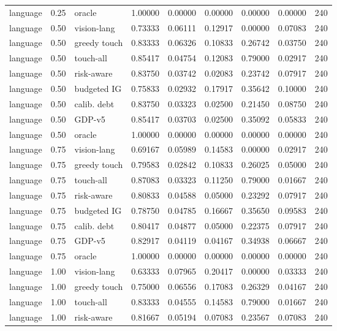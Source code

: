 \documentclass{article}
\begin{document}
\begin{center}
\begin{longtable}{lllllllll}
language & 0.25 & oracle & 1.00000 & 0.00000 & 0.00000 & 0.00000 & 0.00000 & 240 \\
language & 0.50 & vision-lang & 0.73333 & 0.06111 & 0.12917 & 0.00000 & 0.07083 & 240 \\
language & 0.50 & greedy touch & 0.83333 & 0.06326 & 0.10833 & 0.26742 & 0.03750 & 240 \\
language & 0.50 & touch-all & 0.85417 & 0.04754 & 0.12083 & 0.79000 & 0.02917 & 240 \\
language & 0.50 & risk-aware & 0.83750 & 0.03742 & 0.02083 & 0.23742 & 0.07917 & 240 \\
language & 0.50 & budgeted IG & 0.75833 & 0.02932 & 0.17917 & 0.35642 & 0.10000 & 240 \\
language & 0.50 & calib. debt & 0.83750 & 0.03323 & 0.02500 & 0.21450 & 0.08750 & 240 \\
language & 0.50 & GDP-v5 & 0.85417 & 0.03703 & 0.02500 & 0.35092 & 0.05833 & 240 \\
language & 0.50 & oracle & 1.00000 & 0.00000 & 0.00000 & 0.00000 & 0.00000 & 240 \\
language & 0.75 & vision-lang & 0.69167 & 0.05989 & 0.14583 & 0.00000 & 0.02917 & 240 \\
language & 0.75 & greedy touch & 0.79583 & 0.02842 & 0.10833 & 0.26025 & 0.05000 & 240 \\
language & 0.75 & touch-all & 0.87083 & 0.03323 & 0.11250 & 0.79000 & 0.01667 & 240 \\
language & 0.75 & risk-aware & 0.80833 & 0.04588 & 0.05000 & 0.23292 & 0.07917 & 240 \\
language & 0.75 & budgeted IG & 0.78750 & 0.04785 & 0.16667 & 0.35650 & 0.09583 & 240 \\
language & 0.75 & calib. debt & 0.80417 & 0.04877 & 0.05000 & 0.22375 & 0.07917 & 240 \\
language & 0.75 & GDP-v5 & 0.82917 & 0.04119 & 0.04167 & 0.34938 & 0.06667 & 240 \\
language & 0.75 & oracle & 1.00000 & 0.00000 & 0.00000 & 0.00000 & 0.00000 & 240 \\
language & 1.00 & vision-lang & 0.63333 & 0.07965 & 0.20417 & 0.00000 & 0.03333 & 240 \\
language & 1.00 & greedy touch & 0.75000 & 0.06556 & 0.17083 & 0.26329 & 0.04167 & 240 \\
language & 1.00 & touch-all & 0.83333 & 0.04555 & 0.14583 & 0.79000 & 0.01667 & 240 \\
language & 1.00 & risk-aware & 0.81667 & 0.05194 & 0.07083 & 0.23567 & 0.07083 & 240 \\

\end{longtable}
\end{center}
\end{document}
